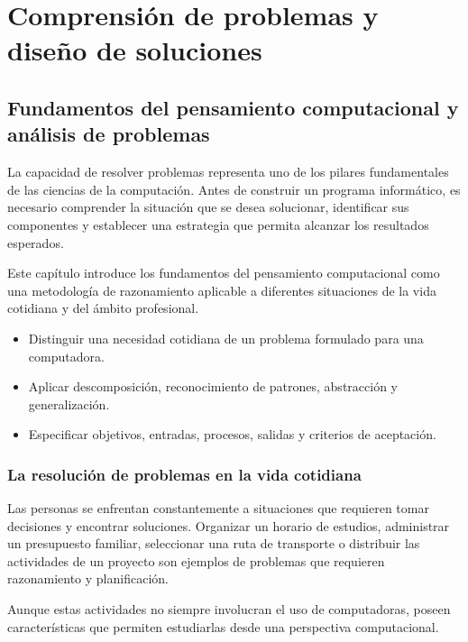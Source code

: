 \part{Comprensión de problemas y diseño de soluciones}

\chapter{Fundamentos del pensamiento computacional y análisis de problemas}
\label{cap:01-pensamiento-computacional}

La capacidad de resolver problemas representa uno de los pilares fundamentales de las ciencias de la computación. Antes de construir un programa informático, es necesario comprender la situación que se desea solucionar, identificar sus componentes y establecer una estrategia que permita alcanzar los resultados esperados.

Este capítulo introduce los fundamentos del pensamiento computacional como una metodología de razonamiento aplicable a diferentes situaciones de la vida cotidiana y del ámbito profesional.

\begin{resultados}
  \begin{itemize}
    \item Distinguir una necesidad cotidiana de un problema formulado para una computadora.
    \item Aplicar descomposición, reconocimiento de patrones, abstracción y generalización.
    \item Especificar objetivos, entradas, procesos, salidas y criterios de aceptación.
  \end{itemize}
\end{resultados}

\section{La resolución de problemas en la vida cotidiana}

Las personas se enfrentan constantemente a situaciones que requieren tomar decisiones y encontrar soluciones. Organizar un horario de estudios, administrar un presupuesto familiar, seleccionar una ruta de transporte o distribuir las actividades de un proyecto son ejemplos de problemas que requieren razonamiento y planificación.

Aunque estas actividades no siempre involucran el uso de computadoras, poseen características que permiten estudiarlas desde una perspectiva computacional.

